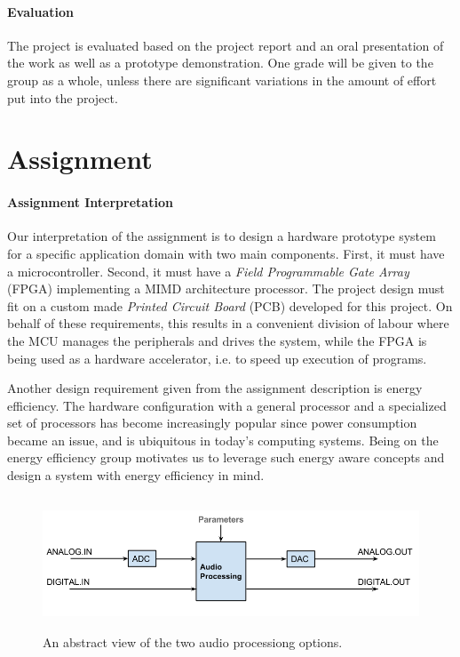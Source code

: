 \paragraph{Evaluation}
The project is evaluated based on the project report and an oral presentation of
the work as well as a prototype demonstration. One grade will be given to the
group as a whole, unless there are significant variations in the amount of
effort put into the project.

\section{Assignment}

\paragraph{Assignment Interpretation}\label{intro:our-assignment-interpretation}
Our interpretation of the assignment is to design a hardware prototype system for a
specific application domain with two main components. First, it must have a
microcontroller. Second, it must have a \textit{Field Programmable Gate Array} (FPGA)
implementing a MIMD architecture processor. The project design must fit on a custom
made \textit{Printed Circuit Board} (PCB) developed for this project. On behalf of these
requirements, this results in a convenient division of labour where the MCU manages
the peripherals and drives the system, while the FPGA is being used as a hardware
accelerator, i.e. to speed up execution of programs.

Another design requirement given from the assignment description is energy
efficiency. The hardware configuration with a general processor and a
specialized set of processors has become increasingly popular since power
consumption became an issue, and is ubiquitous in today's computing systems.
Being on the energy efficiency group motivates us to leverage such energy aware
concepts and design a system with energy efficiency in mind.

\begin{figure}[H]
    \centering
    \includegraphics[height=150px]{figures/intro/intro_audio_analog_digital.png}
    \caption{An abstract view of the two audio processiong options.}
    \label{fig:audio_path_overview}
\end{figure}


